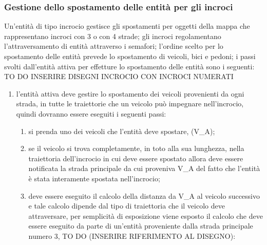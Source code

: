 \subsubsection{Gestione dello spostamento delle entità per gli incroci}
\label{spostamentoIncroci}
Un'entità di tipo incrocio gestisce gli spostamenti per oggetti della mappa che rappresentano incroci con 3 o con 4 strade; gli incroci regolamentano l'attraversamento di entità attraverso i semafori; l'ordine scelto per lo spostamento delle entità prevede lo spostamento di veicoli, bici e pedoni; i passi svolti dall'entità attiva per effetture lo spostamento delle entità sono i seguenti:
TO DO INSERIRE DISEGNI INCROCIO CON INCROCI NUMERATI
\begin{enumerate}
\item l'entità attiva deve gestire lo spostamento dei veicoli provenienti da ogni strada, in tutte le traiettorie che un veicolo può impegnare nell'incrocio, quindi dovranno essere eseguiti i seguenti passi:
\begin{enumerate}
\item si prenda uno dei veicoli che l'entità deve spostare, (V\_A);
\item se il veicolo si trova completamente, in toto alla sua lunghezza, nella traiettoria dell'incrocio in cui deve essere spostato allora deve essere notificata la strada principale da cui proveniva V\_A del fatto che l'entità è stata interamente spostata nell'incrocio;
\item deve essere eseguito il calcolo della distanza da V\_A al veicolo successivo e tale calcolo dipende dal tipo di traiettoria che il veicolo deve attraversare, per semplicità di esposizione viene esposto il calcolo che deve essere eseguito da parte di un'entità proveniente dalla strada principale numero 3, TO DO (INSERIRE RIFERIMENTO AL DISEGNO):
\begin{itemize}

\end{itemize}
\end{enumerate}
\end{enumerate}
